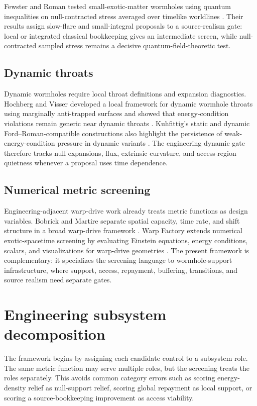 \documentclass[11pt]{article}
\begin{document}
Fewster and Roman tested small-exotic-matter wormholes using quantum inequalities on null-contracted stress averaged over timelike worldlines \citep{fewster_roman_2005}.  Their results assign slow-flare and small-integral proposals to a source-realism gate: local or integrated classical bookkeeping gives an intermediate screen, while null-contracted sampled stress remains a decisive quantum-field-theoretic test.

\subsection{Dynamic throats}

Dynamic wormholes require local throat definitions and expansion diagnostics.  Hochberg and Visser developed a local framework for dynamic wormhole throats using marginally anti-trapped surfaces and showed that energy-condition violations remain generic near dynamic throats \citep{hochberg_visser_1998}.  Kuhfittig's static and dynamic Ford--Roman-compatible constructions also highlight the persistence of weak-energy-condition pressure in dynamic variants \citep{kuhfittig_2002}.  The engineering dynamic gate therefore tracks null expansions, flux, extrinsic curvature, and access-region quietness whenever a proposal uses time dependence.

\subsection{Numerical metric screening}

Engineering-adjacent warp-drive work already treats metric functions as design variables.  Bobrick and Martire separate spatial capacity, time rate, and shift structure in a broad warp-drive framework \citep{bobrick_martire_2021}.  Warp Factory extends numerical exotic-spacetime screening by evaluating Einstein equations, energy conditions, scalars, and visualizations for warp-drive geometries \citep{helmerich_fuchs_bobrick_2024}.  The present framework is complementary: it specializes the screening language to wormhole-support infrastructure, where support, access, repayment, buffering, transitions, and source realism need separate gates.

\section{Engineering subsystem decomposition}
\label{sec:framework}

The framework begins by assigning each candidate control to a subsystem role.  The same metric function may serve multiple roles, but the screening treats the roles separately.  This avoids common category errors such as scoring energy-density relief as null-support relief, scoring global repayment as local support, or scoring a source-bookkeeping improvement as access viability.
\end{document}
